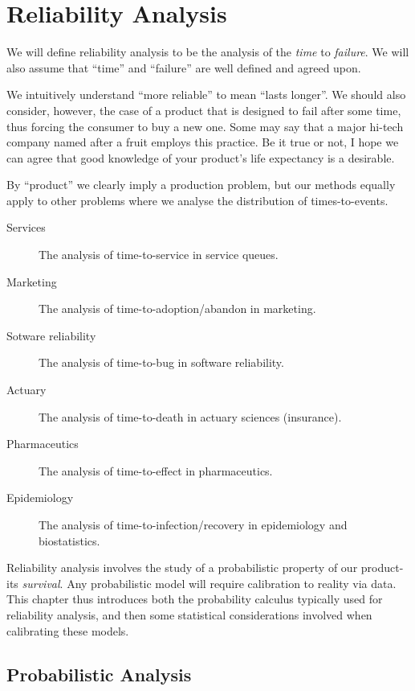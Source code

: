 \chapter{Reliability Analysis}

We will define reliability analysis to be the analysis of the \emph{time} to \emph{failure}.
We will also assume that ``time'' and ``failure'' are well defined and agreed upon.

We intuitively understand ``more reliable'' to mean ``lasts longer''. 
We should also consider, however, the case of a product that is designed to fail after some time, thus forcing the consumer to buy a new one. 
Some may say that a major hi-tech company named after a fruit employs this practice. 
Be it true or not, I hope we can agree that good knowledge of your product's life expectancy is a desirable. 

By ``product'' we clearly imply a production problem, but our methods equally apply to other problems where we analyse the distribution of times-to-events. 
\begin{description}
	\item[Services] The analysis of time-to-service in service queues. 
	\item[Marketing] The analysis of time-to-adoption/abandon in marketing. 
	\item[Sotware reliability] The analysis of time-to-bug in software reliability.
	\item[Actuary] The analysis of time-to-death in actuary sciences (insurance).
	\item[Pharmaceutics] The analysis of time-to-effect in pharmaceutics. 
	\item[Epidemiology] The analysis of time-to-infection/recovery in epidemiology and biostatistics. 
\end{description}

Reliability analysis involves the study of a probabilistic property of our product- its \emph{survival}.
Any probabilistic model will require calibration to reality via data. 
This chapter thus introduces both the probability calculus typically used for reliability analysis, and then some statistical considerations involved when calibrating these models.



\section{Probabilistic Analysis}




